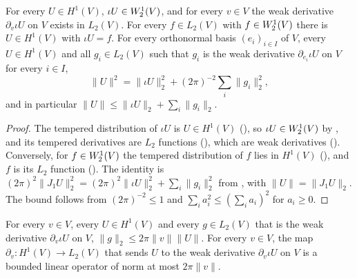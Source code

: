 \begin{lemma}
\label{lem:sobolev-one-weak-gradient-norm}
\leanok
{}
For every $U \in H^1(V)$, $\iota U \in W^{1}_{2}(V)$, and for every $v \in V$ the weak
derivative $\partial_v \iota U$ on $V$ exists in $L_2(V)$. For every $f \in L_2(V)$ with
$f \in W^{1}_{2}(V)$ there is $U \in H^1(V)$ with $\iota U = f$. For every orthonormal basis
$(e_i)_{i \in I}$ of $V$, every $U \in H^1(V)$ and all $g_i \in L_2(V)$ such that $g_i$ is the
weak derivative $\partial_{e_i} \iota U$ on $V$ for every $i \in I$,
\[
  \|U\|^2 = \|\iota U\|_2^2 + (2 \pi)^{-2} \sum_i \|g_i\|_2^2 ,
\]
and in particular $\|U\| \leq \|\iota U\|_2 + \sum_i \|g_i\|_2$.
\end{lemma}

\begin{proof}
\leanok
The tempered distribution of $\iota U$ is $U \in H^1(V)$ (), so
$\iota U \in W^{1}_{2}(V)$ by , and its tempered derivatives are
$L_2$ functions (), which are weak derivatives
(). Conversely, for $f \in W^{1}_{2}(V)$ the tempered
distribution of $f$ lies in $H^1(V)$ (), and $f$ is its $L_2$ function
(). The identity is
$(2\pi)^2 \|J_1 U\|_2^2 = (2\pi)^2 \|\iota U\|_2^2 + \sum_i \|g_i\|_2^2$ from
, with $\|U\| = \|J_1 U\|_2$. The bound follows from
$(2\pi)^{-2} \leq 1$ and $\sum_i a_i^2 \leq (\sum_i a_i)^2$ for $a_i \geq 0$.
\end{proof}

\begin{lemma}
\label{lem:sobolev-one-weak-derivative-operator}
\leanok
{}
For every $v \in V$, every $U \in H^1(V)$ and every $g \in L_2(V)$ that is the weak derivative
$\partial_v \iota U$ on $V$, $\|g\|_2 \leq 2 \pi \|v\| \|U\|$. For every $v \in V$, the map
$\partial_v \colon H^1(V) \to L_2(V)$ that sends $U$ to the weak derivative $\partial_v \iota U$
on $V$ is a bounded linear operator of norm at most $2 \pi \|v\|$.
\end{lemma}

